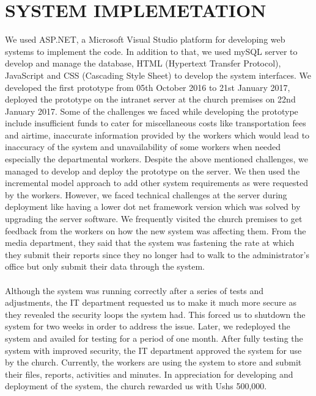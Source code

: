\documentclass{report}
\begin{document}
\section {SYSTEM IMPLEMETATION}
We used ASP.NET, a Microsoft Visual Studio platform for developing web systems to implement the code. In addition to that, we used mySQL server to develop and manage the database, HTML (Hypertext Transfer Protocol), JavaScript and CSS (Cascading Style Sheet) to develop the system interfaces. 
We developed the first prototype from 05th October 2016 to 21st January 2017, deployed the prototype on the intranet server at the church premises on 22nd January 2017. Some of the challenges we faced while developing the prototype include insufficient funds to cater for miscellaneous costs like transportation fees and airtime, inaccurate information provided by the workers which would lead to inaccuracy of the system and unavailability of some workers when needed especially the departmental workers. 
Despite the above mentioned challenges, we managed to develop and deploy the prototype on the server. We then used the incremental model approach to add other system requirements as were requested by the workers. However, we faced technical challenges at the server during deployment like having a lower dot net framework version which was solved by upgrading the server software. We frequently visited the church premises to get feedback from the workers on how the new system was affecting them. From the media department, they said that the system was fastening the rate at which they submit their reports since they no longer had to walk to the administrator’s office but only submit their data through the system.
\\
\\
Although the system was running correctly after a series of tests and adjustments, the IT department requested us to make it much more secure as they revealed the security loops the system had. This forced us to shutdown the system for two weeks in order to address the issue. Later, we redeployed the system and availed for testing for a period of one month.
After fully testing the system with improved security, the IT department approved the system for use by the church. Currently, the workers are using the system to store and submit their files, reports, activities and minutes. In appreciation for developing and deployment of the system, the church rewarded us with Ushs 500,000.
\end{document}
